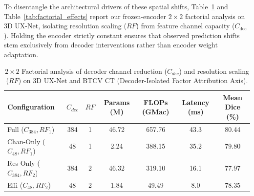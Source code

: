 To disentangle the architectural drivers of these spatial shifts, Table~\ref{tab:factorial} and Table~\ref{tab:factorial_effects} report our frozen-encoder $2\times2$ factorial analysis on 3D UX-Net, isolating resolution scaling ($RF$) from feature channel capacity ($C_{\text{dec}}$). Holding the encoder strictly constant ensures that observed prediction shifts stem exclusively from decoder interventions rather than encoder weight adaptation.

\begin{table}[t]
\centering
\caption{$2\times2$ Factorial analysis of decoder channel reduction ($C_{dec}$) and resolution scaling ($RF$) on 3D UX-Net and BTCV CT (Decoder-Isolated Factor Attribution Axis).}
\label{tab:factorial}
\small
\begin{tabular*}{\textwidth}{@{\extracolsep{\fill}}lcccccc}
\toprule
\textbf{Configuration} & $C_{dec}$ & $RF$ & \textbf{Params (M)} & \textbf{FLOPs (GMac)} & \textbf{Latency (ms)} & \textbf{Mean Dice (\%)} \\
\midrule
Full ($C_{384}, RF_1$) & 384 & 1 & 46.72 & 657.76 & 43.3 & 80.44 \\
Chan-Only ($C_{48}, RF_1$) & 48 & 1 & 2.24 & 388.15 & 35.2 & 79.80 \\
Res-Only ($C_{384}, RF_2$) & 384 & 2 & 46.32 & 319.10 & 16.1 & 77.97 \\
Effi ($C_{48}, RF_2$) & 48 & 2 & 1.84 & 49.49 & 8.0 & 78.35 \\
\bottomrule
\end{tabular*}
\end{table}

\begin{table}[tb]
\centering
\caption{Factor main effects ($\Delta_C, \Delta_{RF}$) and interaction ($\Delta_{C \times RF}$) across metrics on 3D UX-Net (BTCV CT).}
\label{tab:factorial_effects}
\end{table}

